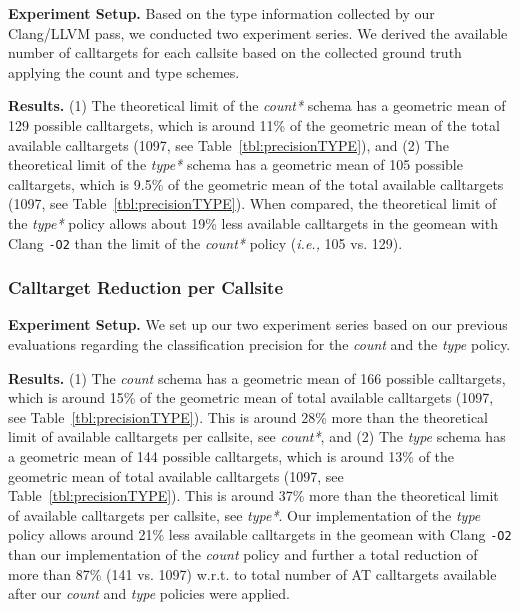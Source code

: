 \textbf{Experiment Setup.} Based on the type information collected by our Clang/LLVM pass, we conducted two experiment series.
We derived the available number of calltargets for each callsite based on the collected ground truth applying the {count} and {type} schemes.

\textbf{Results.}
(1) The theoretical limit of the \textit{count*} schema has a geometric mean of 129 possible calltargets, which is around 11\% of the geometric mean of the total available calltargets (1097, see Table~\ref{tbl:precisionTYPE}), and
(2) The theoretical limit of the \textit{type*} schema has a geometric mean of 105 possible calltargets, which is 9.5\% of the geometric mean of the total available calltargets (1097, see Table~\ref{tbl:precisionTYPE}).
When compared, the theoretical limit of the \textit{type*} policy allows about 19\% less available calltargets in the geomean with Clang \texttt{-O2} than the limit of the \textit{count*} policy (\textit{i.e.,} 105 vs. 129).

\subsubsection{Calltarget Reduction per Callsite}
\label{subsection:typeshieldvslimitcount}
\textit{}

\textbf{Experiment Setup.} We set up our two experiment series based on our previous evaluations regarding the classification precision for the \textit{count} and the \textit{type} policy.

\textbf{Results.}
(1) The \textit{count} schema has a geometric mean of 166 possible calltargets, which is around 15\% of the geometric mean of total available calltargets (1097, see Table~\ref{tbl:precisionTYPE}). 
This is around 28\% more than the theoretical limit of available calltargets per callsite, see \textit{count*}, and
(2)  The \textit{type} schema has a geometric mean of 144 possible calltargets, which is around 13\% of the geometric mean of total available calltargets (1097, see Table~\ref{tbl:precisionTYPE}). 
This is around 37\% more than the theoretical limit of available calltargets per callsite, see \textit{type*}.
Our implementation of the \textit{type} policy allows around 21\% less available calltargets in the geomean with Clang \texttt{-O2} than our implementation of the \textit{count} policy and 
further a total reduction of more than 87\% (141 vs. 1097) w.r.t. to total number of AT calltargets available after our \textit{count} and \textit{type} policies were applied. 


